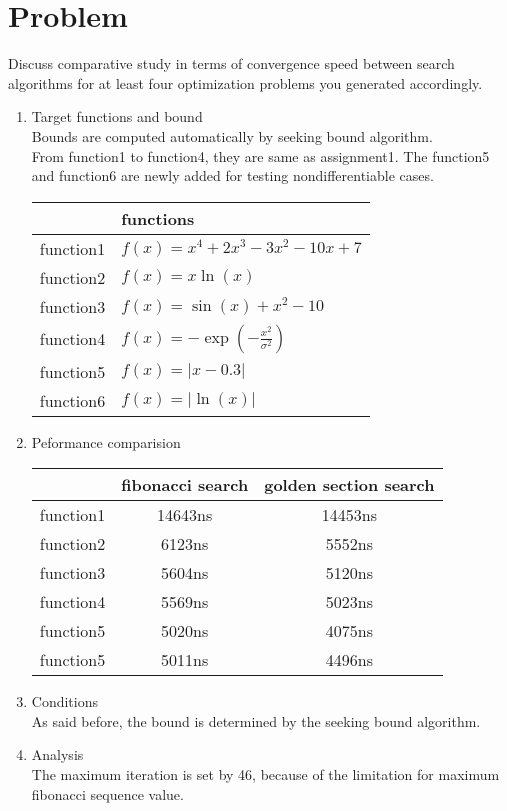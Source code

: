 \documentclass[12pt,letterpaper]{article}
\begin{document}
\section*{Problem}

Discuss comparative study in terms of convergence speed between search algorithms for at least four optimization problems you generated accordingly.

\begin{enumerate}
\item Target functions and bound
\\ Bounds are computed automatically by seeking bound algorithm.
\\ From function1 to function4, they are same as assignment1. The function5 and function6 are newly added for testing nondifferentiable cases.
\begin{center}
    \begin{tabular}{| c | l | }
        \hline
                  & functions                             \\
        \hline
        function1 & $f(x)=x^4 +2x^3-3x^2-10x+7$           \\
        function2 & $f(x)=x\ln(x)$                        \\
        function3 & $f(x)=\sin(x)+x^2-10$                 \\
        function4 & $f(x)=-\exp(-\frac{x^2}{\sigma ^2})$  \\
        function5 & $f(x)=|x-0.3|$                        \\
        function6 & $f(x)=|\ln(x)|$                       \\
        \hline
    \end{tabular}
\end{center}

\item Peformance comparision
\begin{center}
\begin{tabular}{ | c | c | c |}
    \hline
              & fibonacci search & golden section search \\
    \hline
    function1 &  14643ns    & 14453ns   \\
    function2 &  6123ns     & 5552ns    \\
    function3 &  5604ns     & 5120ns    \\
    function4 &  5569ns     & 5023ns    \\
    function5 &  5020ns     & 4075ns    \\
    function5 &  5011ns     & 4496ns    \\
    \hline
\end{tabular}
\end{center}

\item Conditions
\\ As said before, the bound is determined by the seeking bound algorithm.

\item Analysis
\\ The maximum iteration is set by 46, because of the limitation for maximum fibonacci sequence value.
\end{enumerate}
\end{document}
